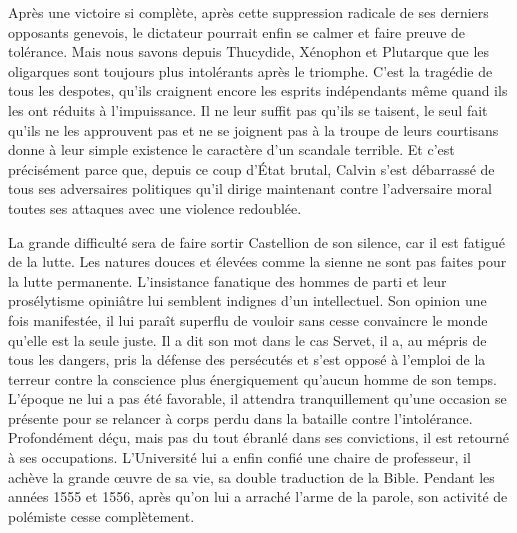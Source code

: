 \documentclass[french,twoside]{book} %
\begin{document}
\noindent Après une victoire si complète, après cette suppression radicale de ses derniers opposants genevois, le dictateur pourrait enfin se calmer et faire preuve de tolérance. Mais nous savons depuis Thucydide, Xénophon et Plutarque que les oligarques sont toujours plus intolérants après le triomphe. C’est la tragédie de tous les despotes, qu’ils craignent encore les esprits indépendants même quand ils les ont réduits à l’impuissance. Il ne leur suffit pas qu’ils se taisent, le seul fait qu’ils ne les approuvent pas et ne se joignent pas à la troupe de leurs courtisans donne à leur simple existence le caractère d’un scandale terrible. Et c’est précisément parce que, depuis ce coup d’État brutal, Calvin s’est débarrassé de tous ses adversaires politiques qu’il dirige maintenant contre l’adversaire moral toutes ses attaques avec une violence redoublée.\par
La grande difficulté sera de faire sortir Castellion de son silence, car il est fatigué de la lutte. Les natures douces et élevées comme la sienne ne sont pas faites pour la lutte permanente. L’insistance fanatique des hommes de parti et leur prosélytisme opiniâtre lui semblent indignes d’un intellectuel. Son opinion une fois manifestée, il lui paraît superflu de vouloir sans cesse convaincre le monde qu’elle est la seule juste. Il a dit son mot dans le cas Servet, il a, au mépris de tous les dangers, pris la défense des persécutés et s’est opposé à l’emploi de la terreur contre la conscience plus énergiquement qu’aucun homme de son temps. L’époque ne lui a pas été favorable, il attendra tranquillement qu’une occasion se présente pour se relancer à corps perdu dans la bataille contre l’intolérance. Profondément déçu, mais pas du tout ébranlé dans ses convictions, il est retourné à ses occupations. L’Université lui a enfin confié une chaire de professeur, il achève la grande œuvre de sa vie, sa double traduction de la Bible. Pendant les années 1555 et 1556, après qu’on lui a arraché l’arme de la parole, son activité de polémiste cesse complètement.\par
\end{document}
